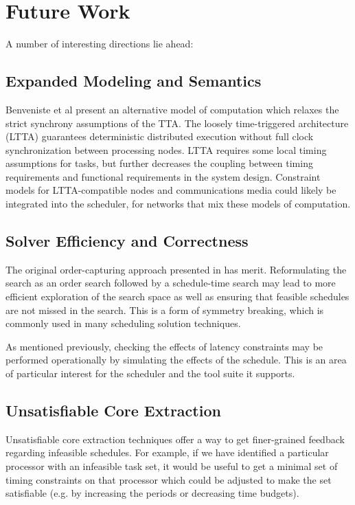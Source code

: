 \section{Future Work}
\label{conclusion}

A number of interesting directions lie ahead:

\subsection{Expanded Modeling and Semantics}

Benveniste et al present an alternative model of computation which relaxes the strict synchrony assumptions of the TTA\cite{moc:ltta}.  The loosely time-triggered architecture (LTTA) guarantees deterministic distributed execution without full clock synchronization between processing nodes.  LTTA requires some local timing assumptions for tasks, but further decreases the coupling between timing requirements and functional requirements in the system design.  Constraint models for LTTA-compatible nodes and communications media could likely be integrated into the scheduler, for networks that mix these models of computation.

\subsection{Solver Efficiency and Correctness}

The original order-capturing approach presented in \cite{sched:offline} has merit.  Reformulating the search as an order search followed by a schedule-time search may lead to more efficient exploration of the search space as well as ensuring that feasible schedules are not missed in the search.  This is a form of symmetry breaking, which is commonly used in many scheduling solution techniques. 

As mentioned previously, checking the effects of latency constraints may be performed operationally by simulating the effects of the schedule.  This is an area of particular interest for the scheduler and the tool suite it supports.

\subsection{Unsatisfiable Core Extraction}

Unsatisfiable core extraction techniques offer a way to get finer-grained feedback regarding infeasible schedules.  For example, if we have identified a particular processor with an infeasible task set, it would be useful to get a minimal set of timing constraints on that processor which could be adjusted to make the set satisfiable (e.g. by increasing the periods or decreasing time budgets).

